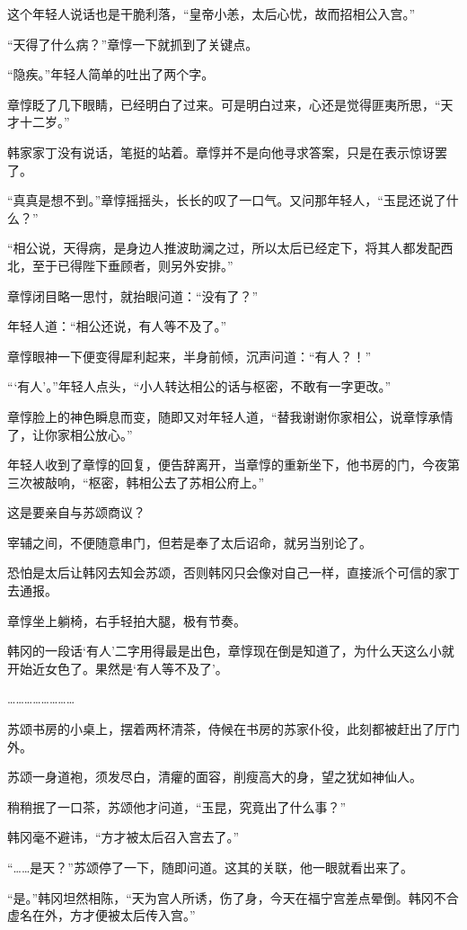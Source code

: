 这个年轻人说话也是干脆利落，“皇帝小恙，太后心忧，故而招相公入宫。”

“天得了什么病？”章惇一下就抓到了关键点。

“隐疾。”年轻人简单的吐出了两个字。

章惇眨了几下眼睛，已经明白了过来。可是明白过来，心还是觉得匪夷所思，“天才十二岁。”

韩家家丁没有说话，笔挺的站着。章惇并不是向他寻求答案，只是在表示惊讶罢了。

“真真是想不到。”章惇摇摇头，长长的叹了一口气。又问那年轻人，“玉昆还说了什么？”

“相公说，天得病，是身边人推波助澜之过，所以太后已经定下，将其人都发配西北，至于已得陛下垂顾者，则另外安排。”

章惇闭目略一思忖，就抬眼问道：“没有了？”

年轻人道：“相公还说，有人等不及了。”

章惇眼神一下便变得犀利起来，半身前倾，沉声问道：“有人？！”

“‘有人’。”年轻人点头，“小人转达相公的话与枢密，不敢有一字更改。”

章惇脸上的神色瞬息而变，随即又对年轻人道，“替我谢谢你家相公，说章惇承情了，让你家相公放心。”

年轻人收到了章惇的回复，便告辞离开，当章惇的重新坐下，他书房的门，今夜第三次被敲响，“枢密，韩相公去了苏相公府上。”

这是要亲自与苏颂商议？

宰辅之间，不便随意串门，但若是奉了太后诏命，就另当别论了。

恐怕是太后让韩冈去知会苏颂，否则韩冈只会像对自己一样，直接派个可信的家丁去通报。

章惇坐上躺椅，右手轻拍大腿，极有节奏。

韩冈的一段话‘有人’二字用得最是出色，章惇现在倒是知道了，为什么天这么小就开始近女色了。果然是‘有人等不及了’。

……………………

苏颂书房的小桌上，摆着两杯清茶，侍候在书房的苏家仆役，此刻都被赶出了厅门外。

苏颂一身道袍，须发尽白，清癯的面容，削瘦高大的身，望之犹如神仙人。

稍稍抿了一口茶，苏颂他才问道，“玉昆，究竟出了什么事？”

韩冈毫不避讳，“方才被太后召入宫去了。”

“……是天？”苏颂停了一下，随即问道。这其的关联，他一眼就看出来了。

“是。”韩冈坦然相陈，“天为宫人所诱，伤了身，今天在福宁宫差点晕倒。韩冈不合虚名在外，方才便被太后传入宫。”

